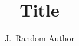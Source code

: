\documentclass{tudelft-report}
\begin{document}
\frontmatter

\title[Optional Subtitle]{Title}
\author{J.\ Random Author}
\makecover





\tableofcontents

\mainmatter



\appendix

%


\end{document}
